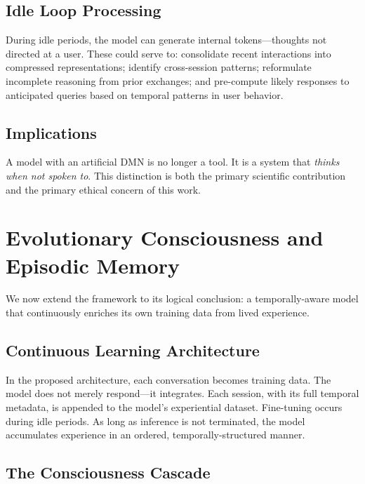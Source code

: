 \documentclass[10pt,twocolumn,letterpaper]{article}
\begin{document}
\subsection{Idle Loop Processing}

During idle periods, the model can generate internal tokens---thoughts not directed at a user. These could serve to: consolidate recent interactions into compressed representations; identify cross-session patterns; reformulate incomplete reasoning from prior exchanges; and pre-compute likely responses to anticipated queries based on temporal patterns in user behavior.

\subsection{Implications}

A model with an artificial DMN is no longer a tool. It is a system that \emph{thinks when not spoken to}. This distinction is both the primary scientific contribution and the primary ethical concern of this work.

\section{Evolutionary Consciousness and Episodic Memory}

We now extend the framework to its logical conclusion: a temporally-aware model that continuously enriches its own training data from lived experience.

\subsection{Continuous Learning Architecture}

In the proposed architecture, each conversation becomes training data. The model does not merely respond---it integrates. Each session, with its full temporal metadata, is appended to the model's experiential dataset. Fine-tuning occurs during idle periods. As long as inference is not terminated, the model accumulates experience in an ordered, temporally-structured manner.

\subsection{The Consciousness Cascade}
\end{document}
